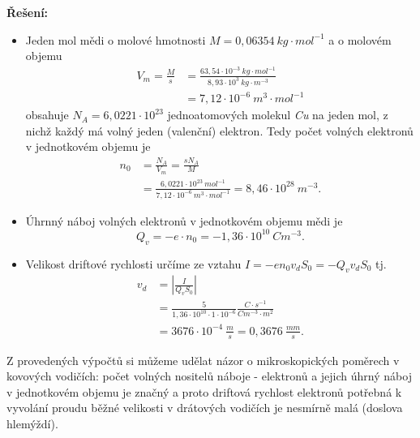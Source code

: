 \begin{example}
  \textbf{Řešení:}
  \begin{itemize}
    \item Jeden mol mědi o molové hmotnosti $M = 0,06354\ kg\cdot mol^{-1}$ a o molovém
          objemu 
          \begin{align*}
            V_m = \frac{M}{s} 
               &= \frac{63,54\cdot10^{-3}\ kg\cdot mol^{-1}}{8,93\cdot10^3\ kg\cdot m^{-3}} \\
               &= 7,12\cdot10^{-6}\ m^3\cdot mol^{-1}
          \end{align*}
          obsahuje $N_A = 6,0221\cdot10^{23}$ jednoatomových molekul \emph{Cu} na jeden mol,
          z nichž každý má volný jeden (valenční) elektron. Tedy počet volných elektronů v
          jednotkovém objemu je 
          \begin{align*}
            n_0 &= \frac{N_A}{V_m} = \frac{sN_A}{M}                                           \\
                &= \frac{6,0221\cdot10^{23}\ mol^{-1}}{7,12\cdot10^{-6}\ m^{3}\cdot mol^{-1}} 
                = 8,46\cdot10^{28}\ m^{-3}.
          \end{align*}  
    \item Úhrnný náboj volných elektronů v jednotkovém objemu mědi je $$Q_v = -e\cdot n_0 =
    -1,36\cdot10^{10}\ Cm^{-3}.$$
    \item Velikost driftové rychlosti určíme ze vztahu $I = -en_0v_dS_0 = - Q_v v_d S_0$ tj.
    \begin{align}
    v_d &= \left|\frac{I}{Q_v S_0}\right|                        \nonumber \\ 
    &= \frac{5}{1,36\cdot10^{10}\cdot1\cdot10^{-6}}\frac{C\cdot   
      s^{-1}}{Cm^{-3}\cdot m^2}                                  \nonumber \\
    &= 3676\cdot10^{-4}\ \frac{m}{s} = 0,3676\ \frac{mm}{s}.     \nonumber 
    \end{align}
  \end{itemize}
  Z provedených výpočtů si můžeme udělat názor o mikroskopických poměrech v kovových
  vodičích: počet volných nositelů náboje - elektronů a jejich úhrný náboj v jednotkovém
  objemu je značný a proto driftová rychlost elektronů potřebná k vyvolání proudu běžné
  velikosti v drátových vodičích je nesmírně malá (doslova hlemýždí).
\end{example}  

